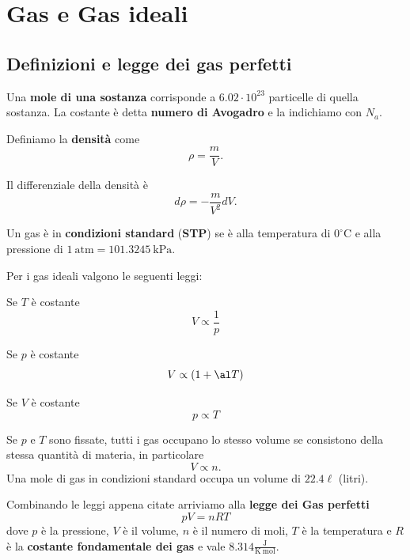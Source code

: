 \chapter{Gas e Gas ideali}

\section{Definizioni e legge dei gas perfetti}
\begin{definition}[Mole]
Una \textbf{mole di una sostanza} corrisponde a $6.02\cdot 10^{23}$ particelle di quella sostanza. La costante \`e detta \textbf{numero di Avogadro} e la indichiamo con $N_a$. 
\end{definition}

\begin{definition}[Densit\`a]
Definiamo la \textbf{densit\`a} come
\[\rho=\frac mV.\]
\end{definition}
\begin{remark}
Il differenziale della densit\`a \`e
\[d\rho=-\frac m{V^2}dV.\]
\end{remark}

\begin{definition}
Un gas \`e in \textbf{condizioni standard} (\textbf{STP}) se \`e alla temperatura di $0^\circ\mathrm C$ e alla pressione di $1\ \mathrm{atm}=101.3245\ \mathrm{kPa}$.
\end{definition}

\noindent Per i gas ideali valgono le seguenti leggi:
\begin{fact}
Se $T$ \`e costante
\[V\propto \frac1p\]
\end{fact}
\begin{fact}
Se $p$ \`e costante
\[V\propto (1+\al T)\]
\end{fact}
\begin{fact}
Se $V$ \`e costante
\[p\propto T\]
\end{fact}
\begin{fact}
Se $p$ e $T$ sono fissate, tutti i gas occupano lo stesso volume se consistono della stessa quantit\`a di materia, in particolare
\[V\propto n.\]
Una mole di gas in condizioni standard occupa un volume di $22.4\ell$ (litri).
\end{fact}

\noindent Combinando le leggi appena citate arriviamo alla \textbf{legge dei Gas perfetti}
\[\boxed{pV=nRT}\]
dove $p$ \`e la pressione, $V$ \`e il volume, $n$ \`e il numero di moli, $T$ \`e la temperatura e $R$ \`e la \textbf{costante fondamentale dei gas} e vale $8.314 \frac{\mathrm{J}}{\mathrm{K}\ \mathrm{mol}}$.

